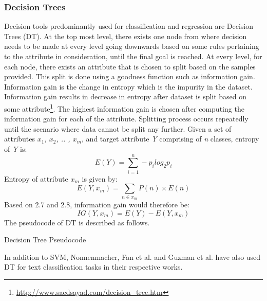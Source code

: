 \documentclass[a4paper,12pt,twoside]{report}
\begin{document}
\subsubsection{Decision Trees}
Decision tools predominantly used for classification and regression are Decision Trees (\acs{DT}). At the top most level, there exists one node from where decision needs to be made at every level going downwards based on some rules pertaining to the attribute in consideration, until the final goal is reached\cite{Jain2017}. 
\newline \newline
At every level, for each node, there exists an attribute that is chosen to split based on the samples provided. This split is done using a goodness function such as information gain. Information gain is the change in entropy which is the impurity in the dataset. Information gain results in decrease in entropy after dataset is split based on some attribute\footnote{\url{http://www.saedsayad.com/decision_tree.htm}}. The highest information gain is chosen after computing the information gain for each of the attribute. Splitting process occurs repeatedly until the scenario where data cannot be split any further\cite{Jain2017}. 
\newline \newline
Given a set of attributes \textit{$x_1$, $x_2$, .. , $x_m$}, and target attribute \textit{Y} comprising of \textit{n} classes, entropy of \textit{Y} is:
\begin{equation}
	E(Y) = \sum\limits_{i=1}^n -p_i log_2 p_i
\end{equation}
\newline
Entropy of attribute $x_m$ is given by:
\begin{equation}
E(Y, x_m) = \sum\limits_{n \in x_m} P(n) \times E(n)
\end{equation}
\newline
Based on 2.7 and 2.8, information gain would therefore be:
\begin{equation}
IG(Y, x_m) = E(Y) - E(Y, x_m)
\end{equation}
The pseudocode of \acs{DT} is described as follows. 
\begin{algorithm}
\caption{Decision Tree Pseudocode}
\begin{algorithmic}[1]
\State {}
	\State {}
   	\State {}
\EndFor
\State {}
\State {}
\State {}
\EndProcedure
\end{algorithmic}
\end{algorithm}
\newline 
In addition to \acs{SVM}, Nonnenmacher\cite{Nonnenmacher2017}, Fan et al.\cite{Fan2017} and Guzman et al.\cite{Guzman2016} have also used \acs{DT} for text classification tasks in their respective works.
\end{document}

